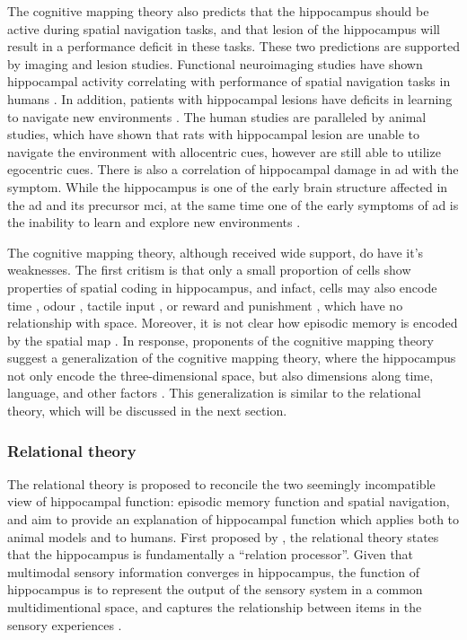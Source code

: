 The cognitive mapping theory also predicts that the hippocampus should be active during spatial navigation tasks, and that lesion of the hippocampus will result in a performance deficit in these tasks. These two predictions are supported by imaging and lesion studies. Functional neuroimaging studies have shown hippocampal activity correlating with performance of spatial navigation tasks in humans \citep{burgess02, hartley07}. In addition, patients with hippocampal lesions have deficits in learning to navigate new environments \citep{hartley07}. The human studies are paralleled by animal studies, which have shown that rats with hippocampal lesion are unable to navigate the environment with allocentric cues, however are still able to utilize egocentric cues\citep{morris06}. There is also a correlation of hippocampal damage in \gls{ad} with the symptom. While the hippocampus is one of the early brain structure affected in the \gls{ad} and its precursor \gls{mci}, at the same time one of the early symptoms of \gls{ad} is the inability to learn and explore new environments \citep{vlcek14}.

The cognitive mapping theory, although received wide support, do have it's weaknesses. The first critism is that only a small proportion of cells show properties of spatial coding in hippocampus, and infact, cells may also encode time \citep{hampson93}, odour \citep{wood99}, tactile input \citep{young94}, or reward and punishment \citep{moser08}, which have no relationship with space. Moreover, it is not clear how episodic memory is encoded by the spatial map \citep{konkel09}. In response, proponents of the cognitive mapping theory suggest a generalization of the cognitive mapping theory, where the hippocampus not only encode the three-dimensional space, but also dimensions along time, language, and other factors \citep{burgess02}. This generalization is similar to the relational theory, which will be discussed in the next section.

\subsubsection{Relational theory}

The relational theory is proposed to reconcile the two seemingly incompatible view of hippocampal function: episodic memory function and spatial navigation, and aim to provide an explanation of hippocampal function which applies both to animal models and to humans. First proposed by \citet{eichenbaum93}, the relational theory states that the hippocampus is fundamentally a ``relation processor''. Given that multimodal sensory information converges in hippocampus, the function of hippocampus is to represent the output of the sensory system in a common multidimentional space, and captures the relationship between items in the sensory experiences \citep{eichenbaum93}.

